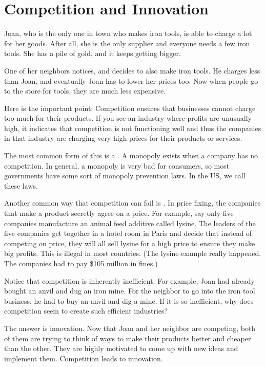 \section{Competition and Innovation}

Joan, who is the only one in town who makes iron tools, is able to charge a lot for her goods.  After all, she is the only supplier and everyone needs a few iron tools. She has a pile of gold, and it keeps getting bigger.

One of her neighbors notices, and decides to also make iron tools.  He charges less than Joan, and eventually Joan has to lower her prices too. Now when people go to the store for tools, they are much less expensive.

Here is the important point: Competition ensures that businesses cannot charge too much for their products. If you see an industry where profits are unusually high, it indicates that competition is not functioning well and thus the companies in that industry are charging very high prices for their products or services.

The most common form of this is a .  A monopoly exists when a company has no competition.  In general, a monopoly is very bad for consumers, so most governments have some sort of monopoly prevention laws. In the US, we call these  laws.

Another common way that competition can fail is . In price fixing, the companies that make a product secretly agree on a
price. For example, say only five companies manufacture an animal feed
additive called lysine.  The leaders of the five companies get together in a hotel room in Paris and decide that instead of competing on price, they will all sell lysine for a high price to ensure they make big profits. This is illegal in most countries. (The lysine example really happened. The companies had to pay \$105 million in fines.)

Notice that competition is inherently inefficient.  For example, Joan had already bought an anvil and dug an iron mine.  For the neighbor to go into the iron tool business, he had to buy an anvil and dig a mine. If it is so inefficient, why does competition seem to create such efficient industries?

The answer is innovation.  Now that Joan and her neighbor are competing, both of them are trying to think of ways to make their products better and cheaper than the other.  They are highly motivated to come up with new ideas and implement them. Competition leads to innovation.

